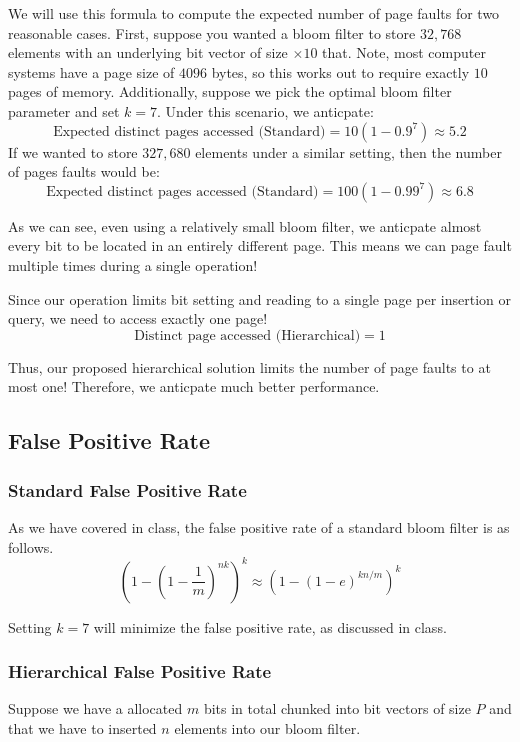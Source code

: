 We will use this formula to compute the expected number of page faults for two reasonable cases.
First, suppose you wanted a bloom filter to store $32,768$ elements with an underlying bit vector of size $\times 10$ that.
Note, most computer systems have a page size of $4096$ bytes, so this works out to require exactly $10$ pages of memory.
Additionally, suppose we pick the optimal bloom filter parameter and set $k=7$.
Under this scenario, we anticpate:
$$\text{Expected distinct pages accessed (Standard)} = 10(1-0.9^7) \approx 5.2$$
If we wanted to store $327,680$ elements under a similar setting, then the number of pages faults would be:
$$\text{Expected distinct pages accessed (Standard)} = 100(1-0.99^7) \approx 6.8$$

As we can see, even using a relatively small bloom filter, we anticpate almost every bit to be located in an entirely different page.
This means we can page fault multiple times during a single operation!

Since our operation limits bit setting and reading to a single page per insertion or query, we need to access exactly one page!
$$\text{Distinct page accessed (Hierarchical)} = 1$$

Thus, our proposed hierarchical solution limits the number of page faults to at most one!
Therefore, we anticpate much better performance.
\subsection{False Positive Rate}

\subsubsection{Standard False Positive Rate}

As we have covered in class, the false positive rate of a standard bloom filter is as follows.
\begin{equation}
    (1 - (1 - \frac{1}{m})^{nk})^k \approx (1 - (1 - e)^{kn/m})^k
\end{equation}

Setting $k=7$ will minimize the false positive rate, as discussed in class.

\subsubsection{Hierarchical False Positive Rate}
Suppose we have a allocated $m$ bits in total chunked into bit vectors of size $P$ and that we have to inserted $n$ elements into our bloom filter.

